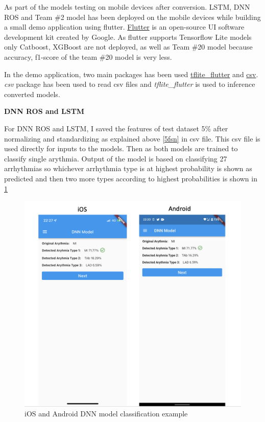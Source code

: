 As part of the models testing on mobile devices after conversion. LSTM, DNN ROS and Team \#2 model has been deployed on the mobile devices while building a small demo application using flutter. \href{https://flutter.dev/}{Flutter} is an open-source UI software development kit created by Google. As flutter supports Tensorflow Lite models only Catboost, XGBoost are not deployed, as well as Team \#20 model because accuracy, f1-score of the team \#20 model is very less. 

In the demo application, two main packages has been used \href{https://pub.dev/packages/tflite\_flutter}{tflite\_flutter} and \href{https://pub.dev/packages/csv}{csv}. \textit{csv} package has been used to read csv files and \textit{tflite\_flutter} is used to inference converted models. 

\textbf{DNN ROS and LSTM}

For DNN ROS and LSTM, I saved the features of test dataset 5\% after normalizing and standardizing as explained above \ref{5fsn} in csv file. This csv file is used directly for inputs to the models. Then as both models are trained to classify single arythmia. Output of the model is based on classifying 27 arrhythmias so whichever arrhythmia type is at highest probability is shown as predicted and then two more types according to highest probabilities is shown in \ref{dnn_deloyment} 


\begin{figure}[H]
\centering
\includegraphics[scale=0.4]{img/dnn_deloyment.png}
\caption{iOS and Android DNN model classification example}
\label{dnn_deloyment}
\end{figure}

